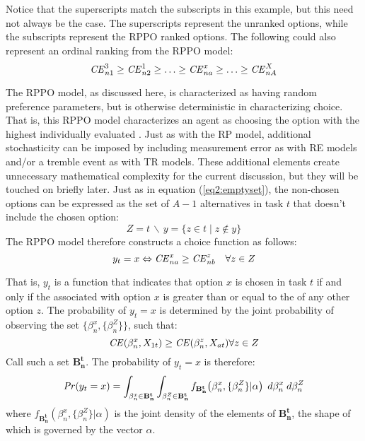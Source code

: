\documentclass[../main.tex]{subfiles}
\begin{document}
Notice that the superscripts match the subscripts in this example, but this need not always be the case.
The superscripts represent the unranked options, while the subscripts represent the RPPO ranked options.
The following could also represent an ordinal ranking from the RPPO model:
\begin{equation}
	\label{eq2:RPPO.CErank.a}
	{\ensuremath{\mathit{CE}}}^3_{n1} \geq {\ensuremath{\mathit{CE}}}^1_{n2} \geq \ldots \geq {\ensuremath{\mathit{CE}}}^x_{na} \geq \ldots \geq {\ensuremath{\mathit{CE}}}^X_{nA}
\end{equation}

The RPPO model, as discussed here, is characterized as having random preference parameters, but is otherwise deterministic in characterizing choice.
That is, this RPPO model characterizes an agent as choosing the option with the highest individually evaluated {\CE}.
Just as with the RP model, additional stochasticity can be imposed by including measurement error as with RE models and/or a tremble event as with TR models.
These additional elements create unnecessary mathematical complexity for the current discussion, but they will be touched on briefly later.
Just as in equation (\ref{eq2:emptyset}), the non-chosen options can be expressed as the set of $A-1$ alternatives in task $t$ that doesn't include the chosen option:
\begin{equation}
	\label{eq2:RPPO:emptyset}
	Z = t \,\backslash\, y = \{z \in t \;|\; z \notin y \}
\end{equation}
\noindent The RPPO model therefore constructs a choice function as follows:
\begin{equation}
	\label{RPPO.y0}
	y_t = x \Leftrightarrow {\ensuremath{\mathit{CE}}}_{na}^x \geq {\ensuremath{\mathit{CE}}}_{nb}^z \quad \forall z \in Z
\end{equation}

That is, $y_t$ is a function that indicates that option $x$ is chosen in task $t$ if and only if the {\CE} associated with option $x$ is greater than or equal to the {\CE} of any other option $z$.
The probability of $y_t = x$ is determined by the joint probability of observing the set $\bigl\{\beta_n^x,\{\beta_n^Z\}\bigr\}$, such that:
\begin{equation}
	\label{eq2:RPPO.y1}
	{\ensuremath{\mathit{CE}}}(\beta_n^x,X_{1t}) \geq {\ensuremath{\mathit{CE}}}(\beta_n^z,X_{at}) \forall z \in Z
\end{equation}
\noindent Call such a set $\mathbf{B^t_n}$.
The probability of $y_t=x$ is therefore:
\begin{equation}
	{\ensuremath{\mathit{Pr}}}(y_t=x) = \int_{\beta_n^x \in \mathbf{B^t_n}}\int_{\beta_n^Z \in \mathbf{B^t_n}} f_{\mathbf{B^t_n}}\!\left(\beta_n^x,\{\beta_n^Z\}|\alpha\right) \;d\beta_n^x \; d\beta_n^Z
\end{equation}
\noindent where $f_{\mathbf{B^t_n}}(\beta_n^x,\{\beta_n^Z\}|\alpha)$ is the joint density of the elements of $\mathbf{B^t_n}$, the shape of which is governed by the vector $\alpha$.
\end{document}
